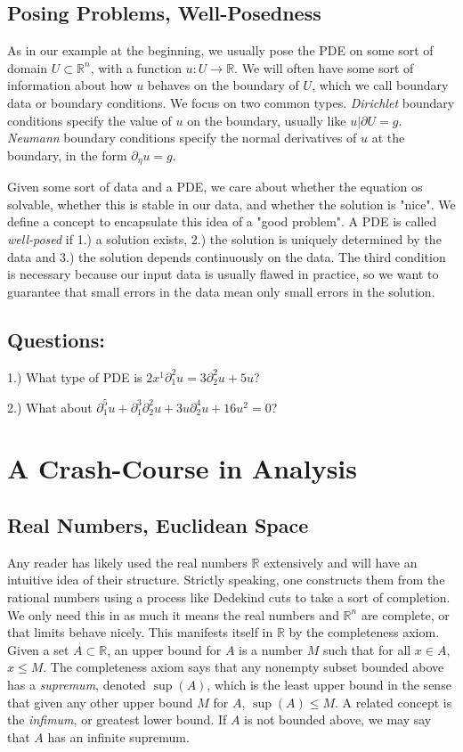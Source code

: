 \documentclass{article}
\newcommand{\R}{{\mathbb{R}}}
\newcommand{\pd}{\partial}
\begin{document}
	
	\subsection{Posing Problems, Well-Posedness}
	
	As in our example at the beginning, we usually pose the PDE on some sort of domain $U\subset \R^{n}$, with a function $u:U \to \R$. We will often have some sort of information about how $u$ behaves on the boundary of $U$, which we call boundary data or boundary conditions. We focus on two common types. \textit{Dirichlet} boundary conditions specify the value of $u$ on the boundary, usually like $u|\pd U = g$. \textit{Neumann} boundary conditions specify the normal derivatives of $u$ at the boundary, in the form $\pd_{\eta} u = g$. 
	
	
	Given some sort of data and a PDE, we care about whether the equation os solvable, whether this is stable in our data, and whether the solution is "nice". We define a concept to encapsulate this idea of a "good problem". A PDE is called \textit{well-posed} if 1.) a solution exists, 2.) the solution is uniquely determined by the data and 3.) the solution depends continuously on the data. The third condition is necessary because our input data is usually flawed in practice, so we want to guarantee that small errors in the data mean only small errors in the solution. 
	
	
	\subsection{Questions:}
	
	1.) What type of PDE is $2x^{1}\pd_{1}^{2}u = 3\pd_{2}^{2}u + 5u$?
	
	2.) What about $\pd_{1}^{5}u + \pd_{1}^{3}\pd_{2}^{2}u + 3u \pd_{2}^{4}u + 16u^{2} = 0$? 
	
	
	\section{A Crash-Course in Analysis}
	

	
	
	\subsection{Real Numbers, Euclidean Space}
	
	Any reader has likely used the real numbers $\R$ extensively and will have an intuitive idea of their structure. Strictly speaking, one constructs them from the rational numbers using a process like Dedekind cuts to take a sort of completion. We only need this in as much it means the real numbers and $\R^{n}$ are complete, or that limits behave nicely. This manifests itself in $\R$ by the completeness axiom. Given a set $A \subset \R$, an upper bound for $A$ is a number $M$ such that for all $x \in A$, $x \leq M$. The completeness axiom says that any nonempty subset bounded above has a \textit{supremum}, denoted $\sup(A)$, which is the least upper bound in the sense that given any other upper bound $M$ for $A$, $\sup(A) \leq M$. A related concept is the \textit{infimum}, or greatest lower bound. If $A$ is not bounded above, we may say that $A$ has an infinite supremum.
	
\end{document}

